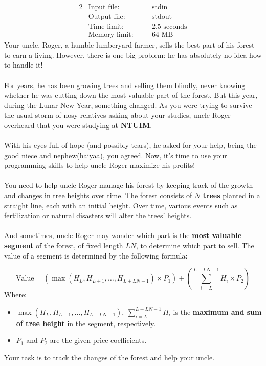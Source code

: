 \documentclass[12pt,a4paper]{article}
\begin{document}
\begin{alignat*} {2}
 &   \text{Input file:}   \quad     &&\text{stdin}\\
 &   \text{Output file:}  \quad     &&\text{stdout}\\
 &   \text{Time limit:}   \quad     &&\text{2.5 seconds}\\
 &   \text{Memory limit:} \quad     &&\text{64 MB}
\end{alignat*}
\noindent
Your uncle, Roger, a humble lumberyard farmer, sells the best part of his forest to earn a living. However, there is one big problem: he has absolutely no idea how to handle it! 
\\\\
\noindent
For years, he has been growing trees and selling them blindly, never knowing whether he was cutting down the most valuable part of the forest. But this year, during the Lunar New Year, something changed. As you were trying to survive the usual storm of nosy relatives asking about your studies, uncle Roger overheard that you were studying at \textbf{NTUIM}.  
\\\\
\noindent
With his eyes full of hope (and possibly tears), he asked for your help, being the good niece and nephew(haiyaa), you agreed. Now, it's time to use your programming skills to help uncle Roger maximize his profits!
\\\\
\noindent
You need to help uncle Roger manage his forest by keeping track of the growth and changes in tree heights over time. The forest consists of \textbf{\(N\) trees} planted in a straight line, each with an initial height. Over time, various events such as fertilization or natural disasters will alter the trees' heights.
\\\\
\noindent
And sometimes, uncle Roger may wonder which part is the \textbf{most valuable segment} of the forest, of fixed length \textbf{\(LN\)}, to determine which part to sell. The value of a segment is determined by the following formula:

\[
\text{Value} = (\max(H_L, H_{L+1}, \dots, H_{L+LN-1}) \times P_1) + (\sum_{i=L}^{L+LN-1} H_i \times P_2)
\]
\noindent
Where:
\begin{itemize}
    \item \( \max(H_L, H_{L+1}, \dots, H_{L+LN-1}),\ \sum_{i=L}^{L+LN-1} H_i \) is the \textbf{maximum and sum of tree height} in the segment, respectively.
    \item \( P_1 \) and \( P_2 \) are the given price coefficients.
\end{itemize}
\noindent
Your task is to track the changes of the forest and help your uncle.
\end{document}
